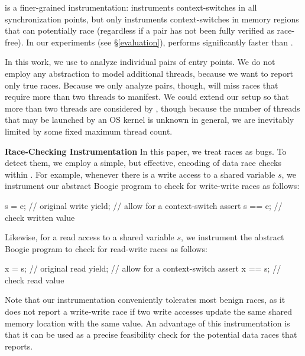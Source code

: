 \yieldmr is a finer-grained instrumentation: \whoop instruments context-switches
in all synchronization points, but only instruments context-switches in memory
regions that can potentially race (regardless if a pair has not been fully
verified as race-free). In our experiments (see \S\ref{evaluation}),
\yieldmr performs significantly faster than \yieldcoarse.

In this work, we use \corral to analyze individual pairs of entry points.
We do not employ any abstraction to model additional threads, because we want \corral to report only true races. Because we only analyze pairs, though, \corral will miss races that require more than two threads to manifest.
We could extend our setup so that more than two threads are considered by \corral, though because the number of threads that may be launched by an OS kernel is unknown in general, we are inevitably limited by some fixed maximum thread count.

\medskip\noindent\textbf{Race-Checking Instrumentation }
%
In this paper, we treat races as bugs. To detect them, we employ a simple, but effective, encoding of data race checks within \corral. For example, whenever there is a write access to a shared variable $s$, we instrument our abstract Boogie program to check for write-write races as follows:
%
\begin{boogie}
s = e;         // original write
yield;         // allow for a context-switch
assert s == e; // check written value
\end{boogie}
%
Likewise, for a read access to a shared variable $s$, we instrument the abstract Boogie program to check for read-write races as follows:
%
\begin{boogie}
x = s;         // original read
yield;         // allow for a context-switch
assert x == s; // check read value
\end{boogie}

Note that our instrumentation conveniently tolerates most benign races, as it does not report a write-write race if two write accesses update the same shared memory location with the same value.  An advantage of this instrumentation is that it can be used as a precise feasibility check for the potential data races that \whoop reports.
